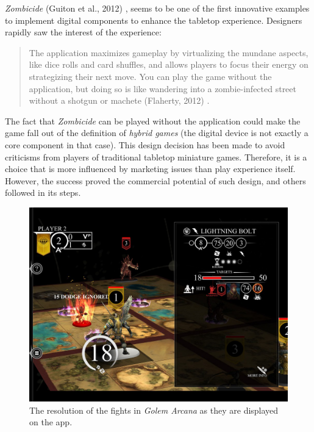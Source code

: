\textit{Zombicide} (Guiton et al., 2012) \cite{game:zombi}, seems to be one of the first innovative examples to implement digital components to enhance the tabletop experience. Designers rapidly saw the interest of the experience:

\begin{quotation}
The application maximizes gameplay by virtualizing the mundane aspects, like dice rolls and card shuffles, and allows players to focus their energy on strategizing their next move. You can play the game without the application, but doing so is like wandering into a zombie-infected street without a shotgun or machete (Flaherty, 2012) \cite{web:wired}.
\end{quotation}

The fact that \textit{Zombicide} can be played without the application could make the game fall out of the definition of \textit{hybrid games} (the digital device is not exactly a core component in that case). This design decision has been made to avoid criticisms from players of traditional tabletop miniature games. Therefore, it is a choice that is more influenced by marketing issues than play experience itself. However, the success proved the commercial potential of such design, and others followed in its steps.

\begin{figure}[!ht]
    \centering
    \includegraphics[scale=0.2]{Images/golem_app.jpg}
    \caption{The resolution of the fights in \textit{Golem Arcana} as they are displayed on the app\cite{pic:golem}.}
    \label{fig:Golem}
\end{figure}

